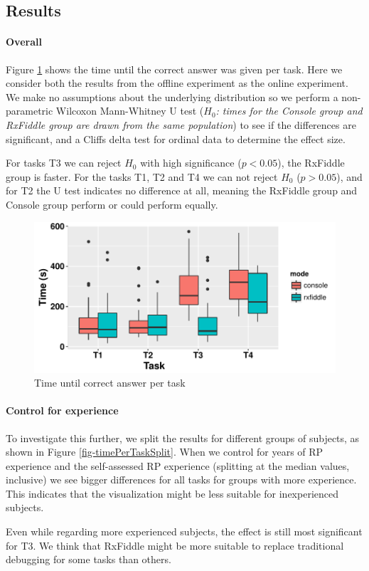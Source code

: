 \subsection{Results}
\paragraph{Overall}
Figure \ref{fig-timePerTask} shows the time until the correct answer was given per task. Here we consider both the results from the offline experiment as the online experiment. We make no assumptions about the underlying distribution so we perform a non-parametric Wilcoxon Mann-Whitney U test (\textit{$H_0$: times for the Console group and RxFiddle group are drawn from the same population}) to see if the differences are significant, and a Cliffs delta test for ordinal data to determine the effect size.

\begin{centering}

\end{centering}

For tasks T3 we can reject $H_0$ with high significance ($p < 0.05$), the RxFiddle group is faster.
For the tasks T1, T2 and T4 we can not reject $H_0$ ($p > 0.05$), and for T2 the U test indicates no difference at all, meaning the RxFiddle group and Console group perform or could perform equally.

\begin{figure}[t]
\includegraphics[width=\columnwidth]{images/timePerTask.pdf}
\caption{Time until correct answer per task}
\label{fig-timePerTask}
\end{figure}

\paragraph{Control for experience}
To investigate this further, we split the results for different groups of subjects, as shown in Figure \ref{fig-timePerTaskSplit}.  When we control for years of RP experience and the self-assessed RP experience (splitting at the median values, inclusive) we see bigger differences for all tasks for groups with more experience. This indicates that the visualization might be less suitable for inexperienced subjects.

Even while regarding more experienced subjects, the effect is still most significant for T3. We think that RxFiddle might be more suitable to replace traditional debugging for some tasks than others.
